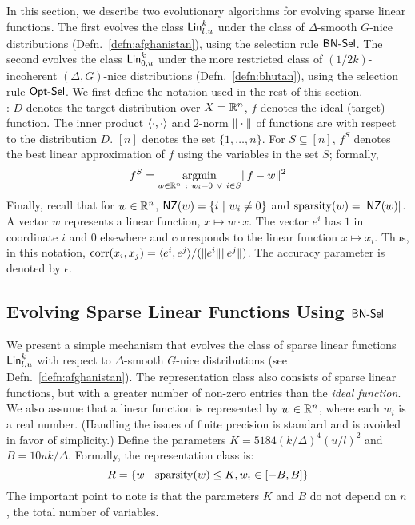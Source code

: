 In this section, we describe two evolutionary algorithms for evolving sparse
linear functions. The first evolves the class $\mathsf{Lin}^k_{l, u}$ under the class of
$\Delta$-smooth $G$-nice distributions (Defn.~\ref{defn:afghanistan}), using the
selection rule $\mathsf{BN\mbox{-}Sel}$. The second evolves the class $\mathsf{Lin}^k_{0, u}$ under the
more restricted class of $(1/2k)$-incoherent $(\Delta, G)$-nice distributions
(Defn.~\ref{defn:bhutan}), using the selection rule $\mathsf{Opt\mbox{-}Sel}$. We
first define the notation used in the rest of this section.\smallskip \\

: $D$ denotes the target distribution over $X =
\mathbb{R}^n$, $f$ denotes the ideal (target) function. The inner product
$\langle \cdot, \cdot \rangle$ and $2$-norm $\Vert \cdot \Vert$ of functions are with
respect to the distribution $D$. $[n]$ denotes the set $\{1, \ldots, n\}$. For
$S \subseteq [n]$, $f^S$ denotes the best linear approximation of $f$ using the
variables in the set $S$; formally,
\begin{align}
f^S = \underset{w \in \reals^n~:~ w_i = 0 ~\vee~i \in S}\argmin \ltwonorm{f -
w}^2 \nonumber %
\end{align}
Finally, recall that for $w \in \mathbb{R}^n$, $\mathsf{NZ}(w) = \{i ~|~ w_i \neq 0 \}$ and
$\mathrm{sparsity}(w) = |\mathsf{NZ}(w)|$. A vector $w$ represents a linear function, $x \mapsto
w \cdot x$. The vector $e^i$ has $1$ in coordinate $i$ and $0$ elsewhere and
corresponds to the linear function $x \mapsto x_i$. Thus, in this notation,
$\mathrm{corr}(x_i, x_j) = \langle e^i, e^j \rangle/(\Vert e^i \Vert\Vert e^j \Vert)$. The accuracy
parameter is denoted by $\epsilon$. 

\subsection{Evolving Sparse Linear Functions Using $\mathsf{BN\mbox{-}Sel}$}
\label{sec:sparse_linear}

We present a simple mechanism that evolves the class of sparse linear functions
$\mathsf{Lin}^k_{l, u}$ with respect to $\Delta$-smooth $G$-nice distributions (see
Defn.~\ref{defn:afghanistan}). The representation class also consists of
sparse linear functions, but with a greater number of non-zero entries than the
\emph{ideal function}. We also assume that a linear function is represented by
$w \in \mathbb{R}^n$, where each $w_i$ is a real number. (Handling the issues of
finite precision is standard and is avoided in favor of simplicity.) Define the
parameters $K = 5184(k/\Delta)^4(u/l)^2$ and $B = 10 uk /\Delta$. Formally, the
representation class is:
\[ 
R = \{ w ~|~ \mathrm{sparsity}(w) \leq K, w_i \in [-B, B] \}
\]
The important point to note is that the parameters $K$ and $B$ do not depend on
$n$, the total number of variables.

